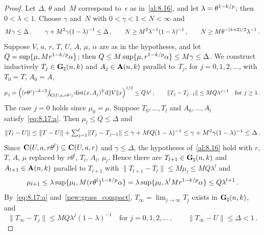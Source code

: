 \begin{proof}
    Let $\Delta$, $\theta$ and~$M$ correspond to~$\epsilon$ as in~\ref{al:8.16}, and let $\lambda
    = \theta^{1 - k/p}$; then $0 < \lambda < 1$. Choose $\gamma$ and~$N$ with $0 < \gamma < 1 <
    N < \infty$ and
    \begin{displaymath}
        M \gamma \le \Delta \,, \qquad \gamma + M^2 \gamma (1 - \lambda)^{-1} \le \Delta \,, \qquad
        N \ge M^2 \lambda^{-1} (1 - \lambda)^{-1} \,, \qquad N \ge M \theta^{-(k+2)/2}
        \lambda^{-1} \,.
    \end{displaymath}
    Suppose $V$, $a$, $r$, $T$, $U$, $A$, $\mu$, $\alpha$ are as in the hypotheses, and let $Q =
    \sup \{ \mu, M r^{1 - k/p} \alpha \}$; then $Q \le M \sup \{ \mu, r^{1-k/p} \alpha \}
    \le M \gamma \le \Delta$. We construct inductively $T_j \in \mathbf{G}_{\natural}(n,k)$ and $A_j \in
    \mathbf{A}(n,k)$ parallel to~$T_j$, for $j = 0, 1, 2, \ldots$, with $T_0 = T$, $A_0 =
    A$,
    \begin{equation}
        \label{eq:8.17:a}
        \mu_j = \Big( (r \theta^j)^{-k-2} {\textstyle\int_{\mathbf{C} ( U, a, r \theta^j )}^{}} \operatorname{dist}(x, A_j)^2
        \,\mathrm{d} \|V\| x \Big)^{1/2} \le Q \lambda^j \,, \qquad \|T_j - T_{j-1}\| \le M Q \lambda^{j-1}
        \quad \text{for $j \ge 1$} \,.
    \end{equation}
    The case $j = 0$ holds since $\mu_0 = \mu$. Suppose $T_0, \ldots, T_l$ and $A_0, \ldots, A_l$
    satisfy~\eqref{eq:8.17:a}. Then $\mu_l \le Q \le \Delta$ and
    \begin{displaymath}
        \|T_l - U\| \le \|T - U\| + {\textstyle\sum_{j=1}^{l}} \|T_j - T_{j-1}\| \le \gamma + M Q (1 -
        \lambda)^{-1} \le \gamma + M^2 \gamma (1 - \lambda)^{-1} \le \Delta \,.
    \end{displaymath}
    Since $\mathbf{C} ( U, a, r \theta^l ) \subseteq \mathbf{C} ( U, a, r )$ and $\gamma \le \Delta$, the
    hypotheses of~\ref{al:8.16} hold with $r$, $T$, $A$, $\mu$ replaced by $r \theta^l$, $T_l$,
    $A_l$, $\mu_l$. Hence there are $T_{l+1} \in \mathbf{G}_{\natural}(n,k)$ and $A_{l+1} \in
    \mathbf{A}(n,k)$ parallel to $T_{l+1}$ with $\|T_{l+1} - T_l\| \le M \mu_l \le M Q
    \lambda^l$ and
    \begin{displaymath}
        \mu_{l+1} \le \lambda \sup \{ \mu_l, M (r \theta^l)^{1 - k/p} \alpha \} = \lambda \sup
        \{ \mu_l, \lambda^l M r^{1 - k/p} \alpha \} \le Q \lambda^{l+1} \,.
    \end{displaymath}
    By~\eqref{eq:8.17:a} and~\ref{new:grass_compact}, $T_\infty = \lim_{j \to \infty} T_j$ exists in
    $\mathbf{G}_{\natural}(n,k)$, and
    \begin{equation}
        \label{eq:8.17:b}
        \|T_\infty - T_j\| \le M Q \lambda^j (1 - \lambda)^{-1} \quad \text{for $j = 0, 1, 2,
        \ldots$} \,, \qquad \|T_\infty - U\| \le \Delta < 1 \,.
    \end{equation}


\end{proof}
